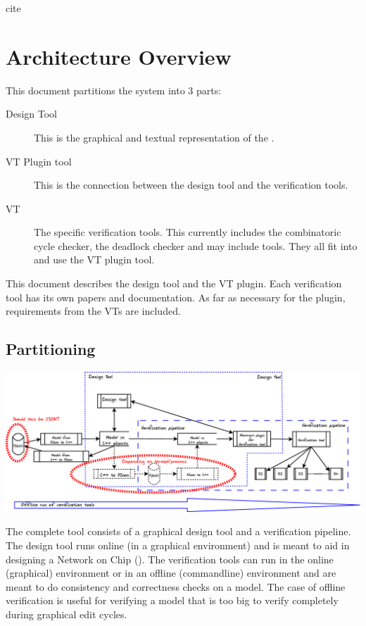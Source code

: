 cite\chapter{Architecture Overview}

This document partitions the system into 3 parts:

\begin{description}
	\item[Design Tool] This is the graphical and textual representation of the
	\Noc.
	\item[VT Plugin tool] This is the connection between the design tool and the verification
	tools. 
	\item[VT] The specific verification tools. This currently includes the combinatoric cycle 
	checker, the deadlock checker and may include tools. They all fit into and use the VT plugin
	tool.
\end{description}

This document describes the design tool and the VT plugin. Each verification tool has its own papers
and documentation. As far as necessary for the plugin, requirements from the VTs are included.


\section{Partitioning}

\begin{center}
	\includegraphics[width=.9\linewidth]{../architecture-tool-scope}
\end{center}

The complete tool consists of a graphical design tool and a verification pipeline.
The design tool runs online (in a graphical environment) and is meant to aid in 
designing a Network on Chip (\Noc). The verification tools can run in the online 
(graphical) environment or in an offline (commandline) environment and are meant 
to do consistency and correctness checks on a model.
The case of offline verification is useful for verifying a model that is 
too big to verify completely during graphical edit cycles.


